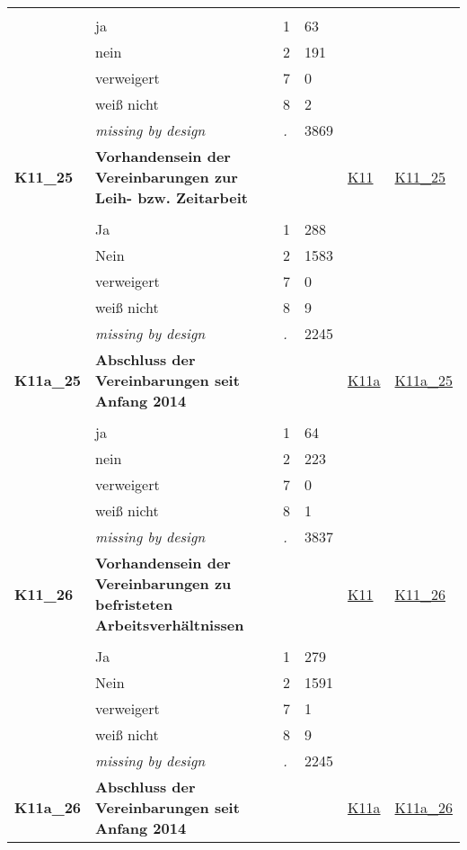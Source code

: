 \begin{longtable}{| L{2.45cm} | L{6cm} | C{1.5cm} | R{1cm} | C{2.25cm} | C{2.25cm} |}
   &  &  &  &  &  \\ 
   & ja & 1 & 63 &  &  \\ 
   & nein & 2 & 191 &  &  \\ 
   & verweigert & 7 & 0 &  &  \\ 
   & weiß nicht & 8 & 2 &  &  \\ 
   & \textit{missing by design} & \textit{.} & 3869 &  &  \\ 
   \midrule
\textbf{K11\_25}\label{var:K11:25} & \textbf{Vorhandensein der Vereinbarungen zur Leih- bzw. Zeitarbeit} &  &  & \hyperref[K11]{K11} & \hyperref[var:suf:K11:25]{K11\_25} \\ 
   &  &  &  &  &  \\ 
   & Ja & 1 & 288 &  &  \\ 
   & Nein & 2 & 1583 &  &  \\ 
   & verweigert & 7 & 0 &  &  \\ 
   & weiß nicht & 8 & 9 &  &  \\ 
   & \textit{missing by design} & \textit{.} & 2245 &  &  \\ 
   \midrule
\textbf{K11a\_25}\label{var:K11a:25} & \textbf{Abschluss der Vereinbarungen seit Anfang 2014} &  &  & \hyperref[K11a]{K11a} & \hyperref[var:suf:K11a:25]{K11a\_25} \\ 
   &  &  &  &  &  \\ 
   & ja & 1 & 64 &  &  \\ 
   & nein & 2 & 223 &  &  \\ 
   & verweigert & 7 & 0 &  &  \\ 
   & weiß nicht & 8 & 1 &  &  \\ 
   & \textit{missing by design} & \textit{.} & 3837 &  &  \\ 
   \midrule
\textbf{K11\_26}\label{var:K11:26} & \textbf{Vorhandensein der Vereinbarungen zu befristeten Arbeitsverhältnissen} &  &  & \hyperref[K11]{K11} & \hyperref[var:suf:K11:26]{K11\_26} \\ 
   &  &  &  &  &  \\ 
   & Ja & 1 & 279 &  &  \\ 
   & Nein & 2 & 1591 &  &  \\ 
   & verweigert & 7 & 1 &  &  \\ 
   & weiß nicht & 8 & 9 &  &  \\ 
   & \textit{missing by design} & \textit{.} & 2245 &  &  \\ 
   \midrule
\textbf{K11a\_26}\label{var:K11a:26} & \textbf{Abschluss der Vereinbarungen seit Anfang 2014} &  &  & \hyperref[K11a]{K11a} & \hyperref[var:suf:K11a:26]{K11a\_26} \\ 

\end{longtable}
